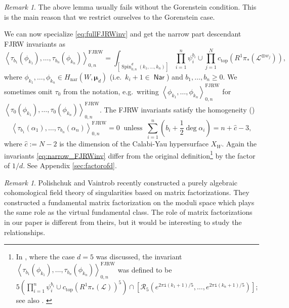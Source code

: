 \documentclass[11pt]{amsart}
\theoremstyle{definition} %
\theoremstyle{remark} %
\newtheorem{rem}[thm]{Remark}%
\newcommand{\nar}{\operatorname{nar}}
\def\corr#1{\left\langle #1 \right\rangle}
\newcommand{\bmu}{\boldsymbol{\mu}}
\newcommand{\cL}{\mathcal{L}}
\newcommand{\cR}{\mathcal{R}}
\newcommand{\hc}{\hat{c}}
\newcommand{\Nar}{\operatorname{\mathsf{Nar}}}
\newcommand{\FJRW}{{\operatorname{FJRW}}}
\newcommand{\Spin}{\operatorname{Spin}}
\newcommand{\iu}{\mathtt{i}}
\begin{document}
\begin{rem} 
The above lemma usually fails without the Gorenstein condition. 
This is the main reason that we restrict ourselves to 
the Gorenstein case. 
\end{rem} 
We can now specialize \eqref{eq:fullFJRWinv} and get
the narrow part descendant FJRW invariants as 
\begin{equation} 
\label{eq:narrow_FJRWinv} 
\corr{\tau_{b_1} (\phi_{k_1}),\dots, \tau_{b_n} (\phi_{k_n})
}_{0,n}^{\FJRW} 
= \int_{[\Spin^d_{0,n}(k_1,\dots,k_n)]} 
\prod_{i=1}^n \psi_i^{b_i} \cup 
\prod_{j=1}^N c_{\text{top}}
\left
(R^1\pi_* (\cL^{\otimes w_j})
\right),   
\end{equation} 
where $\phi_{k_1},\dots, \phi_{k_n} \in H_{\nar}(W,\bmu_d)$ 
(i.e.\ $k_i+1 \in \Nar$) and $b_1,\dots, b_n\ge 0$. 
We sometimes omit $\tau_0$ from the notation, e.g.\ 
writing $\corr{\phi_{k_1},\dots,\phi_{k_n}}^{\FJRW}_{0,n}$ 
for $\corr{\tau_0(\phi_{k_1}),\dots,\tau_0(\phi_{k_n})}^{\FJRW}_{0,n}$. 
The FJRW invariants satisfy the homogeneity 
(\cite[Dimension Axiom in \S 4.1]{FJR1}) 
\begin{equation} 
\label{eq:homogeneity_FJRW} 
\corr{\tau_{b_1} (\alpha_1),\dots, 
\tau_{b_n}(\alpha_n)}_{0,n}^{\FJRW}=0 
\ \text{ unless } \ 
\sum_{i=1}^n (b_i + \frac{1}{2}\deg \alpha_i) = n + \hc -3,  
\end{equation} 
where $\hc:=N-2$ is the dimension of the Calabi-Yau hypersurface 
$X_W$. 
Again the invariants \eqref{eq:narrow_FJRWinv} differ 
from the original definition\footnote
{In \cite[\S3.1, (15)]{ChiRquintic}, where the case $d=5$ was 
discussed, the invariant
$\corr{\tau_{b_1} (\phi_{k_1}),\dots, \tau_{b_n} (\phi_{k_n})
}_{0,n}^{\FJRW}$ was defined to be 
$5 \left(\prod_{i=1}^n \psi_i^{b_i} \cup c_{\text{top}}
(R^1\pi_* (\cL))^5  \right) 
\cap \left[\cR_5(e^{2\pi \iu (k_1+1)/5},\dots,e^{2\pi \iu (k_n+1)/5})
\right]$; 
see also \cite[\S2.3, (14)]{ChiRquintic}. 
\label{footnote:reltoChiR}} \cite{FJR1, ChiRquintic} by the 
factor of $1/d$. See Appendix \ref{sec:factorofd}. 

\begin{rem} 
Polishchuk and Vaintrob \cite{PV:MF-cohFT} 
recently constructed a purely algebraic 
cohomological field theory of singularities based 
on matrix factorizations. 
They constructed a fundamental matrix factorization 
on the moduli space which plays the 
same role as the virtual fundamental class. 
The role of matrix factorizations in our paper 
is different from theirs, but 
it would be interesting to study the relationships. 
\end{rem} 
\end{document}
